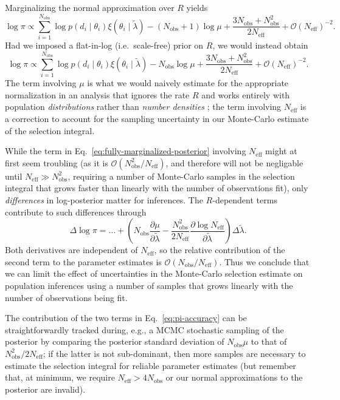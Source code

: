 \documentclass[modern]{aastex62}
\newcommand{\Neff}{N_\mathrm{eff}}
\newcommand{\Nobs}{N_\mathrm{obs}}
\begin{document}
%
Marginalizing the normal approximation over $R$ yields
%
\begin{equation}
  \log \pi \propto \sum_{i=1}^{\Nobs} \log p\left( d_i \mid \theta_i \right) \xi\left( \theta_i \mid \tilde{\lambda} \right) - \left( \Nobs + 1 \right) \log \mu + \frac{3 \Nobs + \Nobs^2}{2 \Neff} + \mathcal{O} \left( \Neff \right)^{-2}.
\end{equation}
%
Had we imposed a flat-in-log (i.e.\ scale-free) prior on $R$, we would instead
obtain
%
\begin{equation}
  \label{eq:fully-marginalized-posterior}
  \log \pi \propto \sum_{i=1}^{\Nobs} \log p\left( d_i \mid \theta_i \right) \xi\left( \theta_i \mid \tilde{\lambda} \right) - \Nobs \log \mu + \frac{3 \Nobs + \Nobs^2}{2 \Neff} + \mathcal{O} \left( \Neff \right)^{-2}.
\end{equation}
%
The term involving $\mu$ is what we would naively estimate for the appropriate
normalization in an analysis that ignores the rate $R$ and works entirely with
population \emph{distributions} rather than \emph{number densities}
\citep{Mandel2018,Fishbach2018}; the term involving $\Neff$ is a correction to
account for the sampling uncertainty in our Monte-Carlo estimate of the
selection integral.

While the term in Eq.\ \eqref{eq:fully-marginalized-posterior} involving $\Neff$
might at first seem troubling (as it is $\mathcal{O} \left( \Nobs^2 / \Neff
\right)$, and therefore will not be negligable until $\Neff \gg \Nobs^2$,
requiring a number of Monte-Carlo samples in the selection integral that grows
faster than linearly with the number of observations fit), only
\emph{differences} in log-posterior matter for inferences.  The $R$-dependent
terms contribute to such differences through
%
\begin{equation}
  \label{eq:pi-accuracy}
  \Delta \log \pi = \ldots + \left( \Nobs \frac{\partial \mu}{\partial \tilde{\lambda}} - \frac{\Nobs^2}{2 \Neff} \frac{\partial \log \Neff}{\partial \tilde{\lambda}} \right) \Delta \tilde{\lambda}.
\end{equation}
%
Both derivatives are independent of $\Neff$, so the relative contribution of the
second term to the parameter estimates is $\mathcal{O}\left( \Nobs / \Neff
\right)$.  Thus we conclude that we can limit the effect of uncertainties in the
Monte-Carlo selection estimate on population inferences using a number of
samples that grows linearly with the number of observations being fit.

The contribution of the two terms in Eq.\ \eqref{eq:pi-accuracy} can be
straightforwardly tracked during, e.g., a MCMC stochastic sampling of the
posterior by comparing the posterior standard deviation of $\Nobs \mu$ to that
of $\Nobs^2/2\Neff$; if the latter is not sub-dominant, then more samples are
necessary to estimate the selection integral for reliable parameter estimates
(but remember that, at minimum, we require $\Neff > 4 \Nobs$ or our normal
approximations to the posterior are invalid).
\end{document}
